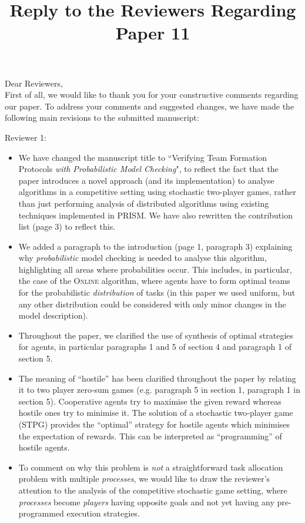 \documentclass[a4paper,10pt]{article}
\title{Reply to the Reviewers Regarding Paper 11}
\author{}
\begin{document}
\maketitle

\noindent Dear Reviewers, \\

\noindent First of all, we would like to thank you for your constructive comments regarding our paper.
To address your comments and suggested changes, we have made the following main revisions to the submitted manuscript:
\medskip

\noindent Reviewer 1:
\begin{itemize}

\item We have changed the manuscript title to ``Verifying Team Formation Protocols \emph{with Probabilistic Model Checking}", to reflect the fact that the paper introduces a novel approach (and its implementation) to analyse algorithms in a competitive setting using stochastic two-player games, rather than just performing analysis of distributed algorithms using existing techniques implemented in PRISM. We have also rewritten the contribution list (page 3) to reflect this.

\item We added a paragraph to the introduction (page 1, paragraph 3) explaining why \emph{probabilistic} model checking is needed to analyse this algorithm, highlighting all areas where probabilities occur. This includes, in particular, the case of the \textsc{Online} algorithm, where agents have to form optimal teams for the probabilistic \emph{distribution} of tasks (in this paper we used uniform, but any other distribution could be considered with only minor changes in the model description).

\item Throughout the paper, we clarified the use of synthesis of optimal strategies for agents, in particular paragraphs 1 and 5 of section 4 and paragraph 1 of section 5.

\item The meaning of ``hostile'' has been clarified throughout the paper by relating it to two player zero-sum games (e.g. paragraph 5 in section 1, paragraph 1 in section 5). Cooperative agents try to maximise the given reward whereas hostile ones try to minimise it. The solution of a stochastic two-player game (STPG) provides the ``optimal'' strategy for hostile agents which minimises the expectation of rewards. This can be interpreted as ``programming'' of hostile agents.

\item To comment on why this problem is \emph{not} a straightforward task allocation problem with multiple \emph{processes}, we would like to draw the reviewer's attention to the analysis of the competitive stochastic game setting, where \emph{processes} become \emph{players} having opposite goals and not yet having any pre-programmed execution strategies.

\end{itemize}
\end{document}

